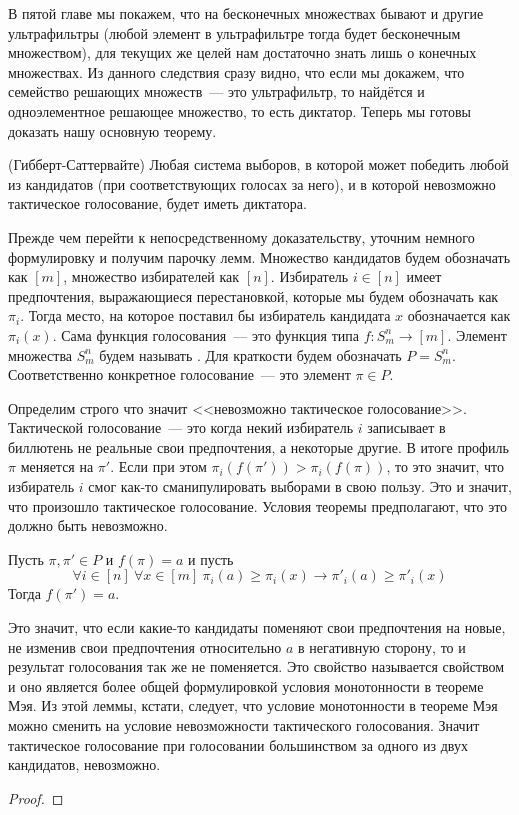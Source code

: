 В пятой главе мы покажем, что на бесконечных множествах бывают и другие ультрафильтры (любой элемент в ультрафильтре тогда будет бесконечным множеством), для текущих же целей нам достаточно знать лишь о конечных множествах. Из данного следствия сразу видно, что если мы докажем, что семейство решающих множеств~--- это ультрафильтр, то найдётся и одноэлементное решающее множество, то есть диктатор. Теперь мы готовы доказать нашу основную теорему.

\begin{thm}
(Гибберт-Саттервайте) Любая система выборов, в которой может победить любой из кандидатов (при соответствующих голосах за него), и в которой невозможно тактическое голосование, будет иметь диктатора.
\end{thm}

Прежде чем перейти к непосредственному доказательству, уточним немного формулировку и получим парочку лемм. Множество кандидатов будем обозначать как $[m]$, множество избирателей как $[n]$. Избиратель $i\in [n]$ имеет предпочтения, выражающиеся перестановкой, которые мы будем обозначать как $\pi_i$. Тогда место, на которое поставил бы избиратель кандидата $x$ обозначается как $\pi_i(x)$. Сама функция голосования~--- это функция типа $f:S_m^n\to [m]$. Элемент множества $S_m^n$ будем называть . Для краткости будем обозначать $P = S_m^n$. Соответственно конкретное голосование~--- это элемент $\pi\in P$.

Определим строго что значит <<невозможно тактическое голосование>>. Тактической голосование~--- это когда некий избиратель $i$ записывает в биллютень не реальные свои предпочтения, а некоторые другие. В итоге профиль $\pi$ меняется на $\pi'$. Если при этом $\pi_i(f(\pi')) > \pi_i(f(\pi))$, то это значит, что избиратель $i$ смог как-то сманипулировать выборами в свою пользу. Это и значит, что произошло тактическое голосование. Условия теоремы предполагают, что это должно быть невозможно.

\begin{lemma}
Пусть $\pi, \pi'\in P$ и $f(\pi) = a$ и пусть
$$\forall i\in [n]\ \forall x\in[m]\ \pi_i(a)\ge\pi_i(x)\to\pi'_i(a)\ge\pi'_i(x)$$
Тогда $f(\pi') = a$.
\end{lemma}

Это значит, что если какие-то кандидаты поменяют свои предпочтения на новые, не изменив свои предпочтения относительно $a$ в негативную сторону, то и результат голосования так же не поменяется. Это свойство называется свойством  и оно является более общей формулировкой условия монотонности в теореме Мэя. Из этой леммы, кстати, следует, что условие монотонности в теореме Мэя можно сменить на условие невозможности тактического голосования. Значит тактическое голосование при голосовании большинством за одного из двух кандидатов, невозможно.

\begin{proof}

\end{proof}